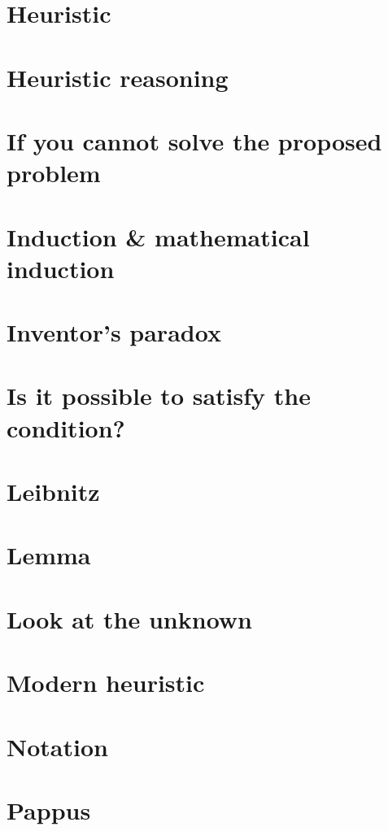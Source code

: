 \documentclass[oneside]{book}
\numberwithin{equation}{section}
\begin{document}
\section{Heuristic}

\section{Heuristic reasoning}

\section{If you cannot solve the proposed problem}

\section{Induction \& mathematical induction}

\section{Inventor's paradox}

\section{Is it possible to satisfy the condition?}

\section{Leibnitz}

\section{Lemma}

\section{Look at the unknown}

\section{Modern heuristic}

\section{Notation}

\section{Pappus}
\end{document}
